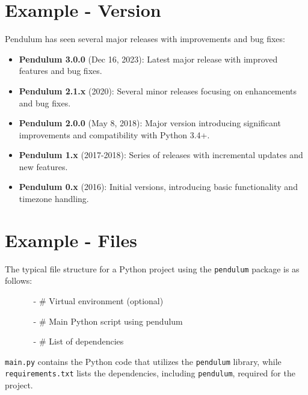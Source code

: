 \section{Example - Version}

Pendulum has seen several major releases with improvements and bug fixes:

\begin{itemize}
	\item \textbf{Pendulum 3.0.0} (Dec 16, 2023): Latest major release with improved features and bug fixes.
	\item \textbf{Pendulum 2.1.x} (2020): Several minor releases focusing on enhancements and bug fixes.
	\item \textbf{Pendulum 2.0.0} (May 8, 2018): Major version introducing significant improvements and compatibility with Python 3.4+.
	\item \textbf{Pendulum 1.x} (2017-2018): Series of releases with incremental updates and new features.
	\item \textbf{Pendulum 0.x} (2016): Initial versions, introducing basic functionality and timezone handling.
\end{itemize}

\section{Example - Files}



The typical file structure for a Python project using the \texttt{pendulum} package is as follows:

\begin{itemize}
  \item[]	
    \begin{itemize}
      \item [-]     \quad \# Virtual environment (optional)
      \item [-]  \quad \# Main Python script using pendulum
      \item [-]     \# List of dependencies
    \end{itemize}	
\end{itemize}	


\texttt{main.py} contains the Python code that utilizes the \texttt{pendulum} library, while \texttt{requirements.txt} lists the dependencies, including \texttt{pendulum}, required for the project.

